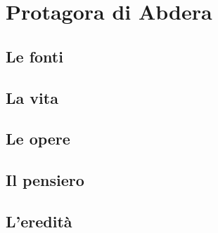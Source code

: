 \chapter{Protagora di Abdera}

\section{Le fonti}

\section{La vita}

\section{Le opere}

\section{Il pensiero}

\section{L'eredità}

